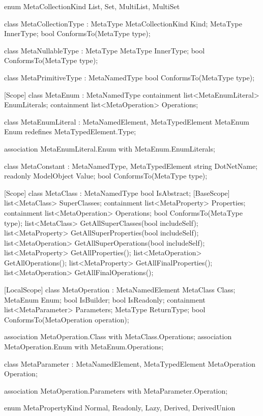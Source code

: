 \documentclass[12pt, a4paper]{report}
\begin{document}
\begin{mmcode}
{	enum MetaCollectionKind
	{
		List,
		Set,
		MultiList,
		MultiSet
	}
	
	class MetaCollectionType : MetaType
	{
		MetaCollectionKind Kind;
		MetaType InnerType;
		bool ConformsTo(MetaType type);
	}
	
	class MetaNullableType : MetaType
	{
		MetaType InnerType;
		bool ConformsTo(MetaType type);
	}
	
	class MetaPrimitiveType : MetaNamedType
	{
		bool ConformsTo(MetaType type);
	}
	
	[Scope]
	class MetaEnum : MetaNamedType
	{
		containment list<MetaEnumLiteral> EnumLiterals;
		containment list<MetaOperation> Operations;
	}
	
	class MetaEnumLiteral : MetaNamedElement, MetaTypedElement
	{
		MetaEnum Enum redefines MetaTypedElement.Type;
	}
	
	association MetaEnumLiteral.Enum with MetaEnum.EnumLiterals;
	
	class MetaConstant : MetaNamedType, MetaTypedElement
	{
		string DotNetName;
		readonly ModelObject Value;
		bool ConformsTo(MetaType type);
	}
	
	[Scope]
	class MetaClass : MetaNamedType
	{
		bool IsAbstract;
		[BaseScope]
		list<MetaClass> SuperClasses;
		containment list<MetaProperty> Properties;
		containment list<MetaOperation> Operations;
		bool ConformsTo(MetaType type);
		list<MetaClass> GetAllSuperClasses(bool includeSelf);
		list<MetaProperty> GetAllSuperProperties(bool includeSelf);
		list<MetaOperation> GetAllSuperOperations(bool includeSelf);
		list<MetaProperty> GetAllProperties();
		list<MetaOperation> GetAllOperations();
		list<MetaProperty> GetAllFinalProperties();
		list<MetaOperation> GetAllFinalOperations();
	}
	
	[LocalScope]
	class MetaOperation : MetaNamedElement
	{
		MetaClass Class;
		MetaEnum Enum;
		bool IsBuilder;
		bool IsReadonly;
		containment list<MetaParameter> Parameters;
		MetaType ReturnType;
		bool ConformsTo(MetaOperation operation);
	}
	
	association MetaOperation.Class with MetaClass.Operations;
	association MetaOperation.Enum with MetaEnum.Operations;
	
	class MetaParameter : MetaNamedElement, MetaTypedElement
	{
		MetaOperation Operation;
	}
	
	association MetaOperation.Parameters with MetaParameter.Operation;
	
	enum MetaPropertyKind
	{
		Normal,
		Readonly,
		Lazy,
		Derived,
		DerivedUnion
	}
	
}
\end{mmcode}
\end{document}
